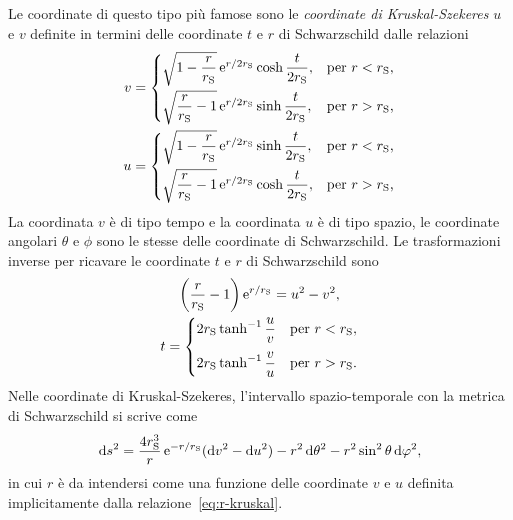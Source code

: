 Le coordinate di questo tipo più famose sono le \emph{coordinate di
  Kruskal-Szekeres} \(u\) e \(v\) definite
in termini delle coordinate \(t\) e \(r\) di Schwarzschild dalle
relazioni~\parencites{1960PhRv..119.1743K}{1960PMatD...7..285S}
\begin{subequations}
  \allowdisplaybreaks{}
  \begin{align}
    v &=
    \begin{cases}
      \sqrt{1 - \dfrac{r}{r_{\textup{S}}}}\e^{r/2r_{\textup{S}}} \cosh
      \dfrac{t}{2r_{\textup{S}}}, & \text{per \(r < r_{\textup{S}}\),} \\[2.1ex]
      \sqrt{\dfrac{r}{r_{\textup{S}}} - 1}\e^{r/2r_{\textup{S}}} \sinh
      \dfrac{t}{2r_{\textup{S}}}, & \text{per \(r > r_{\textup{S}}\),}
    \end{cases} \\
    u &=
    \begin{cases}
      \sqrt{1 - \dfrac{r}{r_{\textup{S}}}}\e^{r/2r_{\textup{S}}} \sinh
      \dfrac{t}{2r_{\textup{S}}}, & \text{per \(r < r_{\textup{S}}\),} \\[2.1ex]
      \sqrt{\dfrac{r}{r_{\textup{S}}} - 1}\e^{r/2r_{\textup{S}}} \cosh
      \dfrac{t}{2r_{\textup{S}}}, & \text{per \(r > r_{\textup{S}}\),}
    \end{cases}
  \end{align}
\end{subequations}
La coordinata \(v\) è di tipo tempo e la coordinata \(u\) è di tipo spazio, le
coordinate angolari \(\theta\) e \(\phi\) sono le stesse delle coordinate di
Schwarzschild.  Le trasformazioni inverse per ricavare le coordinate \(t\) e
\(r\) di Schwarzschild sono
\begin{subequations}
  \allowdisplaybreaks{}
  \begin{gather}
    \label{eq:r-kruskal}
    \biggl(\frac{r}{r_{\textup{S}}} - 1\biggr)\e^{r/r_{\textup{S}}} = u^{2} -
                                                                      v^{2}, \\
    t =
        \begin{cases}
          2r_{\textup{S}}\tanh^{-1}\dfrac{u}{v} & \text{per \(r <
            r_{\textup{S}}\)}, \\[2.1ex]
          2r_{\textup{S}}\tanh^{-1}\dfrac{v}{u} & \text{per \(r >
            r_{\textup{S}}\)}.
        \end{cases}
  \end{gather}
\end{subequations}
Nelle coordinate di Kruskal-Szekeres, l'intervallo spazio-temporale con la
metrica di Schwarzschild si scrive come
\begin{equation}
  \mathop{}\!\mathrm{d} s^{2} = \frac{4r_{\textup{S}}^{3}}{r}\operatorname{\mathrm{e}}^{-r/r_{\textup{S}}}(\mathop{}\!\mathrm{d} v^{2} -
  \mathop{}\!\mathrm{d} u^{2}) - r^{2}\mathop{}\!\mathrm{d}\theta^{2} - r^{2}\sin^{2}\theta\mathop{}\!\mathrm{d}\varphi^{2},
\end{equation}
in cui \(r\) è da intendersi come una funzione delle coordinate \(v\) e \(u\)
definita implicitamente dalla relazione~\eqref{eq:r-kruskal}.

